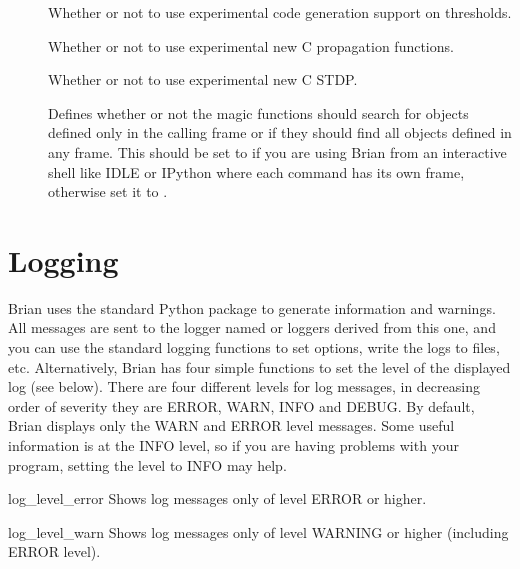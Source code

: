 \documentclass[letterpaper,10pt,english]{manual}
\begin{document}
\begin{description}
\item[] \leavevmode
Whether or not to use experimental code generation support on thresholds.

\item[] \leavevmode
Whether or not to use experimental new C propagation functions.

\item[] \leavevmode
Whether or not to use experimental new C STDP.

\item[] \leavevmode
Defines whether or not the magic functions should search
for objects defined only in the calling frame or if they
should find all objects defined in any frame. This should
be set to  if you are using Brian from an interactive
shell like IDLE or IPython where each command has its own
frame, otherwise set it to .

\end{description}

\resetcurrentobjects
\hypertarget{--doc-reference-logging}{}

\hypertarget{index-88}{}\section{Logging}

Brian uses the standard Python  package to generate information
and warnings. All messages are sent to the logger named  or loggers
derived from this one, and you can use the standard logging functions to
set options, write the logs to files, etc. Alternatively, Brian has four
simple functions to set the level of the displayed log (see below). There
are four different levels for log messages, in decreasing order of severity
they are ERROR, WARN, INFO and DEBUG. By default, Brian displays only the
WARN and ERROR level messages. Some useful information is at the INFO level,
so if you are having problems with your program, setting the level to INFO
may help.

\hypertarget{brian.log_level_error}{}\begin{funcdesc}{log\_level\_error}{}
Shows log messages only of level ERROR or higher.
\end{funcdesc}

\hypertarget{brian.log_level_warn}{}\begin{funcdesc}{log\_level\_warn}{}
Shows log messages only of level WARNING or higher (including ERROR level).
\end{funcdesc}
\end{document}
